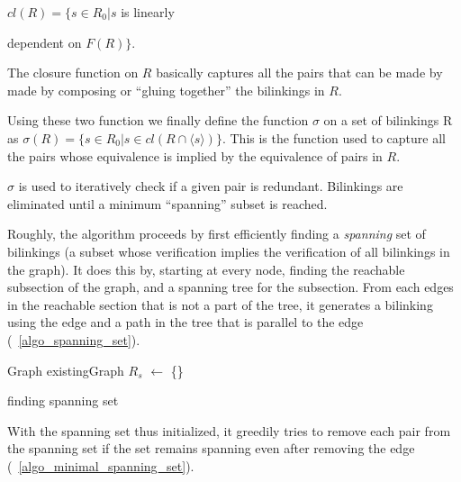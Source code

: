 \documentclass[sigplan,review,anonymous]{acmart}
\begin{document}
$cl(R) = \{ s\in R_0| s$ is linearly {dependent on $F(R) \}$.

The closure function on $R$ basically captures all the pairs that can be made by made by composing or ``gluing together'' the bilinkings in $R$. 

Using these two function we finally define the function $\sigma$ on a set of bilinkings R as
$\sigma(R) = \{s \in R_0 | s\in cl(R\cap \langle s \rangle) \}$.
This is the function used to capture all the pairs whose equivalence is implied by the equivalence of pairs in $R$.

$\sigma$ is used to iteratively check if a given pair is redundant.
Bilinkings are eliminated until a minimum ``spanning'' subset is reached.

Roughly, the algorithm proceeds by first efficiently finding a \textit{spanning} set of bilinkings (a subset whose verification implies the verification of all bilinkings in the graph).
It does this by, starting at every node, finding the reachable subsection of the graph, and a spanning tree for the subsection.
From each edges in the reachable section that is not a part of the tree, it generates a bilinking using the edge and a path in the tree that is parallel to the edge (~\ref{algo_spanning_set}).

\begin{algorithm}
\label{alg_spanning_set}
\DontPrintSemicolon
{}

Graph existingGraph\;
$R_s$ $\gets$ \{\}\;
\;

\caption{finding spanning set}\label{algo_spanning_set}
\end{algorithm}

With the spanning set thus initialized, it greedily tries to remove each pair from the spanning set if the set remains spanning even after removing the edge (~\ref{algo_minimal_spanning_set}).

\begin{algorithm}
\DontPrintSemicolon
{}



\end{algorithm}}
\end{document}
